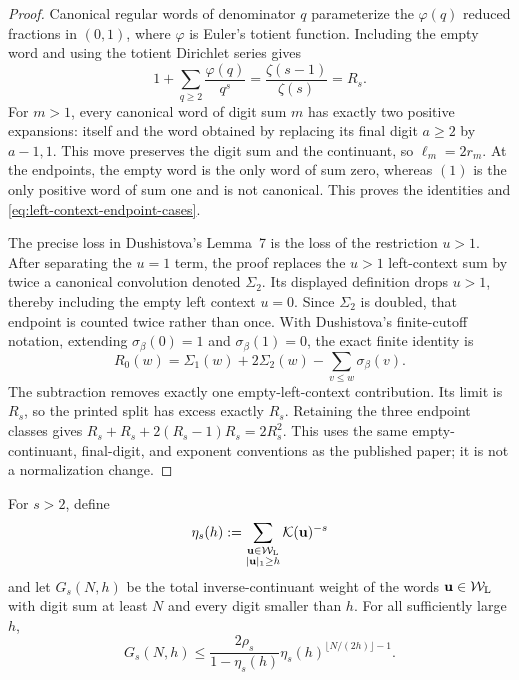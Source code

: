 \begin{proof}
Canonical regular words of denominator \(q\) parameterize the
\(\varphi(q)\) reduced fractions in \((0,1)\), where \(\varphi\) is Euler's
totient function.  Including the empty
word and using the totient Dirichlet series gives
\[
 1+\sum_{q\ge2}\frac{\varphi(q)}{q^s}
 =\frac{\zeta(s-1)}{\zeta(s)}=R_s.
\]
For \(m>1\), every canonical word of digit sum \(m\) has exactly two
positive expansions: itself and the word obtained by replacing its final
digit \(a\ge2\) by \(a-1,1\).  This move preserves the digit sum and the
continuant, so \(\ell_m=2r_m\).  At the endpoints, the empty word is the
only word of sum zero, whereas \((1)\) is the only positive word of sum one
and is not canonical.  This proves the identities and
\eqref{eq:left-context-endpoint-cases}.

The precise loss in Dushistova's Lemma~7
\cite[pp.~668--669]{Dushistova2007} is the loss of the restriction \(u>1\).
After separating the \(u=1\) term, the proof replaces the \(u>1\)
left-context sum by twice a canonical convolution denoted \(\Sigma_2\).
Its displayed definition drops \(u>1\), thereby including the empty left
context \(u=0\).  Since \(\Sigma_2\) is doubled, that endpoint is counted
twice rather than once.  With Dushistova's finite-cutoff notation, extending
\(\sigma_\beta(0)=1\) and \(\sigma_\beta(1)=0\), the exact finite identity is
\[
 R_0(w)=\Sigma_1(w)+2\Sigma_2(w)
        -\sum_{v\le w}\sigma_\beta(v).
\]
The subtraction removes exactly one empty-left-context contribution.  Its
limit is \(R_s\), so the printed split has excess exactly \(R_s\).
Retaining the three endpoint classes gives
\(R_s+R_s+2(R_s-1)R_s=2R_s^2\).  This uses the same
empty-continuant, final-digit, and exponent conventions as the published
paper; it is not a normalization change.
\end{proof}

\begin{lemma}
\label{lem:greedy-moderate-block-bound}
For \(s>2\), define
\[
 \eta_s(h):=
 \sum_{\substack{\mathbf u\in\mathcal W_{\rm L}\\|\mathbf u|_1\ge h}}
 \mathcal K(\mathbf u)^{-s}
\]
and let \(G_s(N,h)\) be the total inverse-continuant weight of the words
\(\mathbf u\in\mathcal W_{\rm L}\) with digit sum at least \(N\) and every
digit smaller than \(h\).  For all sufficiently large \(h\),
\begin{equation}
 G_s(N,h)\le
 \frac{2\rho_s}{1-\eta_s(h)}
 \eta_s(h)^{\lfloor N/(2h)\rfloor-1}.
 \label{eq:moderate-block-bound}
\end{equation}
\end{lemma}

